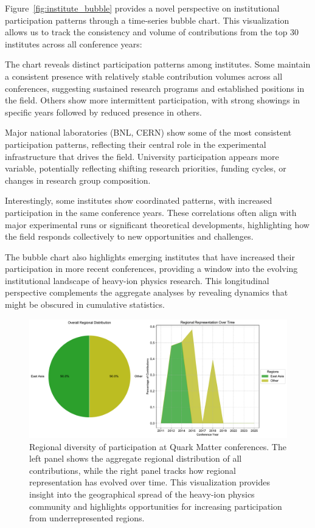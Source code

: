 \documentclass[a4paper,11pt]{article}
\begin{document}
Figure~\ref{fig:institute_bubble} provides a novel perspective on institutional participation patterns through a time-series bubble chart. This visualization allows us to track the consistency and volume of contributions from the top 30 institutes across all conference years:

The chart reveals distinct participation patterns among institutes. Some maintain a consistent presence with relatively stable contribution volumes across all conferences, suggesting sustained research programs and established positions in the field. Others show more intermittent participation, with strong showings in specific years followed by reduced presence in others.

Major national laboratories (BNL, CERN) show some of the most consistent participation patterns, reflecting their central role in the experimental infrastructure that drives the field. University participation appears more variable, potentially reflecting shifting research priorities, funding cycles, or changes in research group composition.

Interestingly, some institutes show coordinated patterns, with increased participation in the same conference years. These correlations often align with major experimental runs or significant theoretical developments, highlighting how the field responds collectively to new opportunities and challenges.

The bubble chart also highlights emerging institutes that have increased their participation in more recent conferences, providing a window into the evolving institutional landscape of heavy-ion physics research. This longitudinal perspective complements the aggregate analyses by revealing dynamics that might be obscured in cumulative statistics.

\begin{figure}[H]
\centering
\includegraphics[width=\textwidth]{figures/regional_diversity.pdf}
\caption{Regional diversity of participation at Quark Matter conferences. The left panel shows the aggregate regional distribution of all contributions, while the right panel tracks how regional representation has evolved over time. This visualization provides insight into the geographical spread of the heavy-ion physics community and highlights opportunities for increasing participation from underrepresented regions.}
\label{fig:regional_diversity}
\end{figure}
\end{document}
